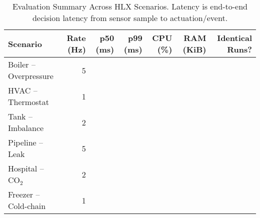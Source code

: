 \begin{table}[t]
\centering
\caption{Evaluation Summary Across HLX Scenarios. Latency is end-to-end decision latency from sensor sample to actuation/event.}
\label{tab:evaluation}
\begin{tabular}{lrrrrrr}
\hline
\textbf{Scenario} & \textbf{Rate (Hz)} & \textbf{p50 (ms)} & \textbf{p99 (ms)} & \textbf{CPU (\%)} & \textbf{RAM (KiB)} & \textbf{Identical Runs?} \\
\hline
Boiler -- Overpressure & 5 &  &  &  &  &  \\
HVAC -- Thermostat     & 1 &  &  &  &  &  \\
Tank -- Imbalance      & 2 &  &  &  &  &  \\
Pipeline -- Leak       & 5 &  &  &  &  &  \\
Hospital -- CO$_2$     & 2 &  &  &  &  &  \\
Freezer -- Cold-chain  & 1 &  &  &  &  &  \\
\hline
\end{tabular}
\end{table}
